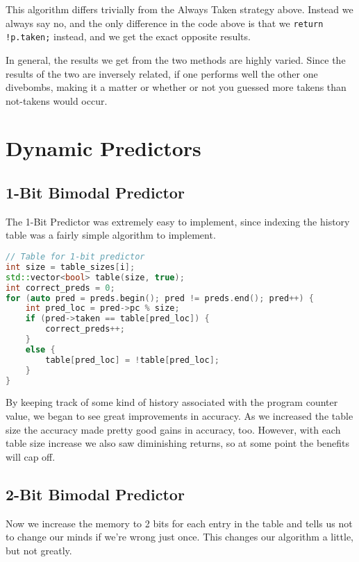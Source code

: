 \documentclass[12pt]{article}
\begin{document}
This algorithm differs trivially from the Always Taken strategy above. Instead
we always say no, and the only difference in the code above is that we
\lstinline|return !p.taken;| instead, and we get the exact opposite results.

In general, the results we get from the two methods are highly varied. Since the
results of the two are inversely related, if one performs well the other one
divebombs, making it a matter or whether or not you guessed more takens than
not-takens would occur.

\section{Dynamic Predictors}

\label{sec:label}

\subsection{1-Bit Bimodal Predictor}
\label{subsec:label}

The 1-Bit Predictor was extremely easy to implement, since indexing the history
table was a fairly simple algorithm to implement.

\begin{lstlisting}[language=C++, caption=Giving our predictor a brain]
// Table for 1-bit predictor
int size = table_sizes[i];
std::vector<bool> table(size, true);
int correct_preds = 0;
for (auto pred = preds.begin(); pred != preds.end(); pred++) {
    int pred_loc = pred->pc % size;
    if (pred->taken == table[pred_loc]) {
        correct_preds++;
    }
    else {
        table[pred_loc] = !table[pred_loc];
    }
}
\end{lstlisting}

By keeping track of some kind of history associated with the program counter
value, we began to see great improvements in accuracy. As we increased the table
size the accuracy made pretty good gains in accuracy, too. However, with each
table size increase we also saw diminishing returns, so at some point the
benefits will cap off.

\subsection{2-Bit Bimodal Predictor}
\label{subsec:label}

Now we increase the memory to 2 bits for each entry in the table and tells us
not to change our minds if we're wrong just once. This changes
our algorithm a little, but not greatly.
\end{document}
